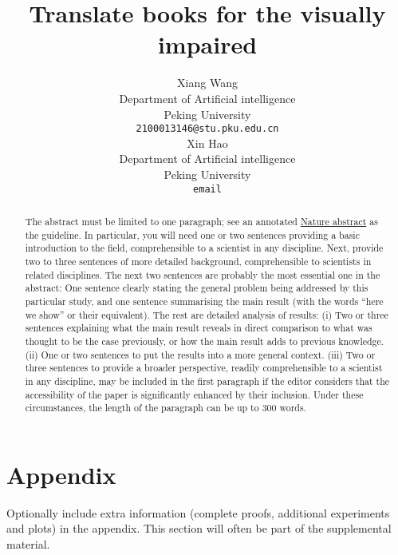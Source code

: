 \documentclass{article}
\title{Translate books for the visually impaired}
\author{%
  Xiang Wang\\
  Department of Artificial intelligence\\
  Peking University\\
  \texttt{2100013146@stu.pku.edu.cn} \\
  \And
  Xin Hao \\
  Department of Artificial intelligence\\
  Peking University\\
  \texttt{email} \\
}
\begin{document}
\maketitle

\begin{abstract}
The abstract must be limited to one paragraph; see an annotated \href{https://cbs.umn.edu/sites/cbs.umn.edu/files/public/downloads/Annotated_Nature_abstract.pdf}{Nature abstract} as the guideline. In particular, you will need one or two sentences providing a basic introduction to the field, comprehensible to a scientist in any discipline. Next, provide two to three sentences of more detailed background, comprehensible to scientists in related disciplines. The next two sentences are probably the most essential one in the abstract: One sentence clearly stating the general problem being addressed by this particular study, and one sentence summarising the main result (with the words ``here we show'' or their equivalent). The rest are detailed analysis of results: (i) Two or three sentences explaining what the main result reveals in direct comparison to what was thought to be the case previously, or how the main result adds to previous knowledge. (ii) One or two sentences to put the results into a more general context. (iii) Two or three sentences to provide a broader perspective, readily comprehensible to a scientist in any discipline, may be included in the first paragraph if the editor considers that the accessibility of the paper is significantly enhanced by their inclusion. Under these circumstances, the length of the paragraph can be up to 300 words.
\end{abstract}






\appendix

\section{Appendix}

Optionally include extra information (complete proofs, additional experiments and plots) in the appendix. This section will often be part of the supplemental material.
\end{document}
